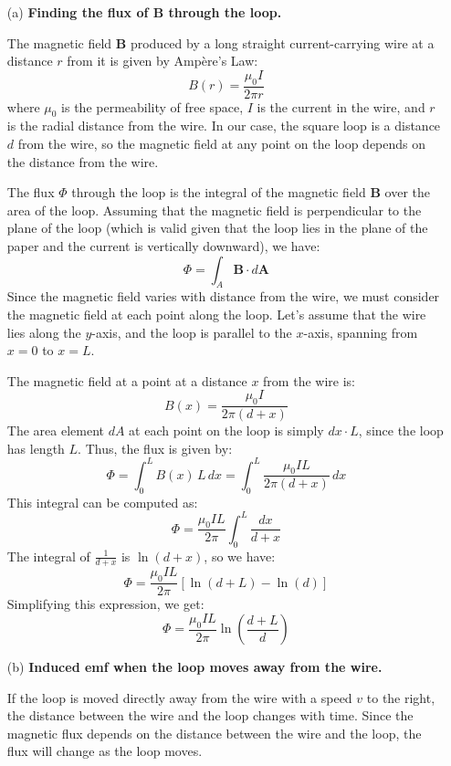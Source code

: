\begin{enumerate}
    \item[(a)] \textbf{Finding the flux of $\mathbf{B}$ through the loop.}
    
    The magnetic field $\mathbf{B}$ produced by a long straight current-carrying wire at a distance $r$ from it is given by Ampère's Law:
    \[
    B(r) = \frac{\mu_0 I}{2\pi r}
    \]
    where $\mu_0$ is the permeability of free space, $I$ is the current in the wire, and $r$ is the radial distance from the wire. In our case, the square loop is a distance $d$ from the wire, so the magnetic field at any point on the loop depends on the distance from the wire.

    The flux $\Phi$ through the loop is the integral of the magnetic field $\mathbf{B}$ over the area of the loop. Assuming that the magnetic field is perpendicular to the plane of the loop (which is valid given that the loop lies in the plane of the paper and the current is vertically downward), we have:
    \[
    \Phi = \int_{A} \mathbf{B} \cdot d\mathbf{A}
    \]
    Since the magnetic field varies with distance from the wire, we must consider the magnetic field at each point along the loop. Let’s assume that the wire lies along the $y$-axis, and the loop is parallel to the $x$-axis, spanning from $x = 0$ to $x = L$.

    The magnetic field at a point at a distance $x$ from the wire is:
    \[
    B(x) = \frac{\mu_0 I}{2\pi (d+x)}
    \]
    The area element $dA$ at each point on the loop is simply $dx \cdot L$, since the loop has length $L$. Thus, the flux is given by:
    \[
    \Phi = \int_0^L B(x) \, L \, dx = \int_0^L \frac{\mu_0 I L}{2\pi (d+x)} \, dx
    \]
    This integral can be computed as:
    \[
    \Phi = \frac{\mu_0 I L}{2\pi} \int_0^L \frac{dx}{d+x}
    \]
    The integral of $\frac{1}{d+x}$ is $\ln(d+x)$, so we have:
    \[
    \Phi = \frac{\mu_0 I L}{2\pi} \left[ \ln(d+L) - \ln(d) \right]
    \]
    Simplifying this expression, we get:
    \[
    \Phi = \frac{\mu_0 I L}{2\pi} \ln \left( \frac{d+L}{d} \right)
    \]

    \item[(b)] \textbf{Induced emf when the loop moves away from the wire.}
    
    If the loop is moved directly away from the wire with a speed $v$ to the right, the distance between the wire and the loop changes with time. Since the magnetic flux depends on the distance between the wire and the loop, the flux will change as the loop moves.


\end{enumerate}
